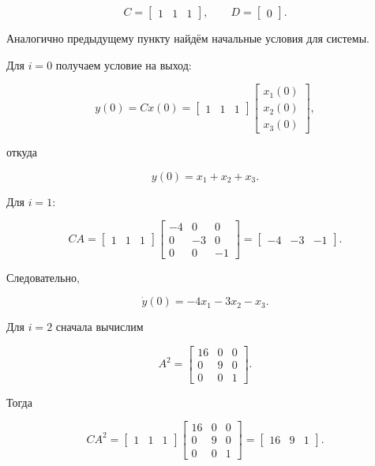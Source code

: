 \documentclass[a4paper, 12pt]{article}
\begin{document}
\[
C =
\begin{bmatrix}
1 & 1 & 1
\end{bmatrix},
\qquad
D =
\begin{bmatrix}
0
\end{bmatrix}.
\]

Аналогично предыдущему пункту найдём начальные условия для системы.

Для $i=0$ получаем условие на выход:

\[
y(0)=Cx(0)
=
\begin{bmatrix}
1 & 1 & 1
\end{bmatrix}
\begin{bmatrix}
x_1(0)\\
x_2(0)\\
x_3(0)
\end{bmatrix},
\]

откуда

\[
y(0)=x_1+x_2+x_3.
\]

Для $i=1$:

\[
CA =
\begin{bmatrix}
1 & 1 & 1
\end{bmatrix}
\begin{bmatrix}
-4 & 0 & 0\\
0 & -3 & 0\\
0 & 0 & -1
\end{bmatrix}
=
\begin{bmatrix}
-4 & -3 & -1
\end{bmatrix}.
\]

Следовательно,

\[
\dot{y}(0)
=
-4x_1-3x_2-x_3.
\]

Для $i=2$ сначала вычислим

\[
A^2 =
\begin{bmatrix}
16 & 0 & 0\\
0 & 9 & 0\\
0 & 0 & 1
\end{bmatrix}.
\]

Тогда

\[
CA^2 =
\begin{bmatrix}
1 & 1 & 1
\end{bmatrix}
\begin{bmatrix}
16 & 0 & 0\\
0 & 9 & 0\\
0 & 0 & 1
\end{bmatrix}
=
\begin{bmatrix}
16 & 9 & 1
\end{bmatrix}.
\]
\end{document}
